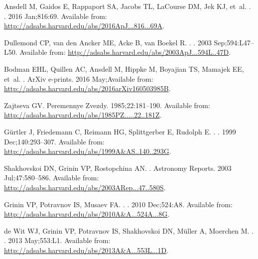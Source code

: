 \documentclass[]{rsos}
\begin{document}
\begin{thebibliography}{10}
{Ansdell} M, {Gaidos} E, {Rappaport} SA, {Jacobs} TL, {LaCourse} DM, {Jek} KJ,
  et~al.
.
\newblock \apj. 2016 Jan;816:69.
\newblock Available from:
  \url{http://adsabs.harvard.edu/abs/2016ApJ...816...69A}.

{Dullemond} CP, {van den Ancker} ME, {Acke} B, {van Boekel} R.
.
\newblock \apjl. 2003 Sep;594:L47--L50.
\newblock Available from:
  \url{http://adsabs.harvard.edu/abs/2003ApJ...594L..47D}.

{Bodman} EHL, {Quillen} AC, {Ansdell} M, {Hippke} M, {Boyajian} TS, {Mamajek}
  EE, et~al.
.
\newblock ArXiv e-prints. 2016 May;Available from:
  \url{http://adsabs.harvard.edu/abs/2016arXiv160503985B}.

{Zajtseva} GV.
\newblock Peremennye Zvezdy. 1985;22:181--190.
\newblock Available from:
  \url{http://adsabs.harvard.edu/abs/1985PZ.....22..181Z}.

{G{\"u}rtler} J, {Friedemann} C, {Reimann} HG, {Splittgerber} E, {Rudolph} E.
.
\newblock \aaps. 1999 Dec;140:293--307.
\newblock Available from:
  \url{http://adsabs.harvard.edu/abs/1999A&AS..140..293G}.

{Shakhovskoi} DN, {Grinin} VP, {Rostopchina} AN.
.
\newblock Astronomy Reports. 2003 Jul;47:580--586.
\newblock Available from:
  \url{http://adsabs.harvard.edu/abs/2003ARep...47..580S}.

{Grinin} VP, {Potravnov} IS, {Musaev} FA.
.
\newblock \aap. 2010 Dec;524:A8.
\newblock Available from:
  \url{http://adsabs.harvard.edu/abs/2010A&A...524A...8G}.

{de Wit} WJ, {Grinin} VP, {Potravnov} IS, {Shakhovskoi} DN, {M{\"u}ller} A,
  {Moerchen} M.
.
\newblock \aap. 2013 May;553:L1.
\newblock Available from:
  \url{http://adsabs.harvard.edu/abs/2013A&A...553L...1D}.


\end{thebibliography}
\end{document}
